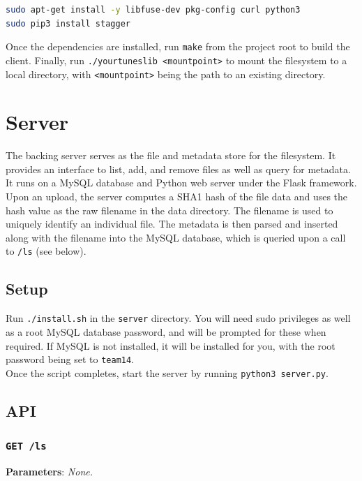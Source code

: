 \documentclass{article}
\begin{document}
\begin{lstlisting}[language=Bash]
sudo apt-get install -y libfuse-dev pkg-config curl python3
sudo pip3 install stagger
\end{lstlisting}
	
	\noindent Once the dependencies are installed, run \texttt{make} from the project root to build the client. Finally, run \texttt{./yourtuneslib <mountpoint>} to mount the filesystem to a local directory, with \texttt{<mountpoint>} being the path to an existing directory.
	
	\section{Server}
	The backing server serves as the file and metadata store for the filesystem. It provides an interface to list, add, and remove files as well as query for metadata. It runs on a MySQL database and Python web server under the Flask framework. \\
	
	\noindent Upon an upload, the server computes a SHA1 hash of the file data and uses the hash value as the raw filename in the data directory. The filename is used to uniquely identify an individual file. The metadata is then parsed and inserted along with the filename into the MySQL database, which is queried upon a call to \texttt{/ls} (see below).
	
	\subsection{Setup}
	Run \texttt{./install.sh} in the \texttt{server} directory. You will need sudo privileges as well as a root MySQL database password, and will be prompted for these when required. If MySQL is not installed, it will be installed for you, with the root password being set to \texttt{team14}. \\
	
	\noindent Once the script completes, start the server by running \texttt{python3 server.py}.
	
	\subsection{API}
	\subsubsection{\texttt{GET /ls}}
	\textbf{Parameters}: \textit{None.} \\
	
\end{document}
